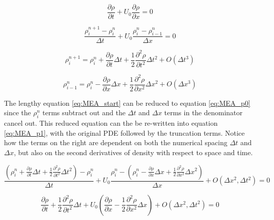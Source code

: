 \documentclass{mc2015}
\begin{document}
    \begin{equation}
    	\label{eq:isokinetic_start}
    	\frac{\partial \rho}{\partial t} + U_{0} \frac{\partial \rho}{\partial x} = 0
    \end{equation}
    
    \begin{equation}
    	\label{eq:mass_isok_fd}
    	\frac{ \rho_{i}^{n+1} - \rho_{i}^{n} }{\Delta t} 
    	+ U_{0} \frac{\rho_{i}^{n} - \rho_{i-1}^{n}}{\Delta x} = 0
    \end{equation}
    
    \begin{equation}
    	\label{eq:rho_taylor_series_time}
    	\rho_{i}^{n+1} =  \rho_{i}^{n} + 
    	\frac{\partial \rho}{\partial t} \Delta t +
    	\frac{1}{2} \frac{\partial^2 \rho}{\partial t^2} \Delta t^2 + O(\Delta t^{3})
    \end{equation}
    
    \begin{equation}
    	\label{eq:rho_taylor_series_space}
    	\rho_{i-1}^{n} =  \rho_{i}^{n} - 
    	\frac{\partial \rho}{\partial x} \Delta x +
    	\frac{1}{2} \frac{\partial^2 \rho}{\partial x^2} \Delta x^2 + O(\Delta x^{3})
    \end{equation}
    
    The lengthy equation \ref{eq:MEA_start} can be reduced to equation
    \ref{eq:MEA_p0} since the $\rho_{i}^{n}$ terms subtract out and the $\Delta
    t$ and $\Delta x$ terms in the denominator cancel out. This reduced equation
    can the be re-written into equation \ref{eq:MEA_p1}, with the original PDE
    followed by the truncation terms. Notice how the terms on the right are
    dependent on both the numerical spacing $\Delta t$ and $\Delta x$, but also
    on the second derivatives of density with respect to space and time.
    
    \begin{equation}
    	\label{eq:MEA_start}
    	\frac{ \left( \rho_{i}^{n} + \frac{\partial \rho}{\partial t} \Delta t +
    	\frac{1}{2} \frac{\partial^2 \rho}{\partial t^2} \Delta t^2 \right)-\rho_{i}^{n} }{\Delta t} 
    	+ U_{0} \frac{\rho_{i}^{n} - \left( \rho_{i}^{n} -  \frac{\partial \rho}{\partial x} \Delta x + 
    	\frac{1}{2} \frac{\partial^2 \rho}{\partial x^2} \Delta x^2 \right)}{\Delta x} 
    	+ O(\Delta x^{2},\Delta t^{2}) 
    	= 0
    \end{equation}
    
    \begin{equation}
    	\label{eq:MEA_p0}
    	 \frac{\partial \rho}{\partial t}  + \frac{1}{2} \frac{\partial^2 \rho}{\partial t^2} \Delta t +
    	 U_{0} \left(   \frac{\partial \rho}{\partial x}  - \frac{1}{2} \frac{\partial^2 \rho}{\partial x^2} \Delta x \right) 
    	 + O(\Delta x^{2},\Delta t^{2}) 
    	 = 0
    \end{equation}
    
\end{document}
